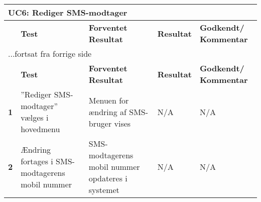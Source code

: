 
\begin{center}
\begin{longtable}{|p{}|p{}|p{}|p{}|p{}|} %
\hline
\multicolumn{5}{|l|}{\textbf{UC6: Rediger SMS-modtager}} \\ \hline
\multicolumn{1}{|c|}{} &
\textbf{Test} &
\textbf{Forventet \newline Resultat} &
\textbf{Resultat} &
\textbf{Godkendt/ \newline Kommentar} \\ \hline 
\endfirsthead

\multicolumn{5}{l}{...fortsat fra forrige side} \\ \hline 
\multicolumn{1}{|c|}{} &
\textbf{Test} &
\textbf{Forventet \newline Resultat} &
\textbf{Resultat} &
\textbf{Godkendt/ \newline Kommentar} \\ \hline 
\endhead


\textbf{1} &
''Rediger SMS-modtager'' vælges i hovedmenu &
Menuen for ændring af SMS-bruger vises &
N/A &
N/A \\\hline

\textbf{2} &
Ændring fortages i SMS-modtagerens mobil nummer &
SMS-modtagerens mobil nummer opdateres i systemet &
N/A &
N/A \\\hline


	\end{longtable}
	\label{ATUC6} 
\end{center}